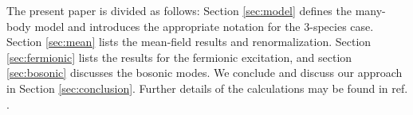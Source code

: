 \documentclass[reprint,pra]{revtex4-1}
\begin{document}
The present paper is divided as follows:
Section \ref{sec:model}  defines the many-body model and introduces the appropriate notation for the 3-species case. Section \ref{sec:mean} lists the mean-field results and renormalization. Section \ref{sec:fermionic} lists the results for the fermionic excitation, and section \ref{sec:bosonic} discusses the bosonic modes. We conclude and discuss our approach in Section \ref{sec:conclusion}.  
 Further details of the calculations may be found in ref. \cite{Zhuthesis}. 
\end{document}
